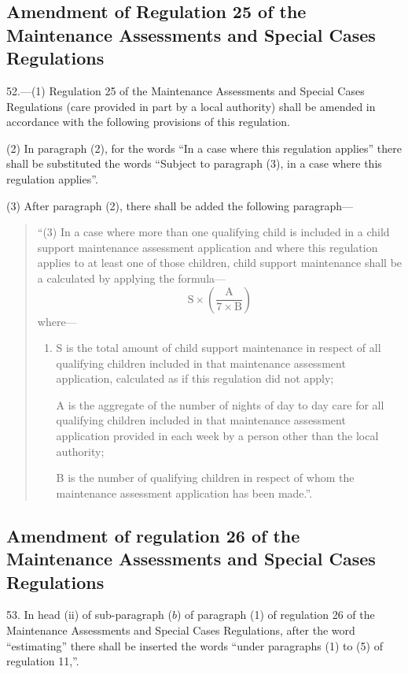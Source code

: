 \documentclass[a4paper]{article}
\begin{document}
\subsection[52. Amendment of Regulation 25 of the Maintenance Assessments and Special Cases Regulations]{Amendment of Regulation 25 of the Maintenance Assessments and Special Cases Regulations}

52.—(1) Regulation 25 of the Maintenance Assessments and Special Cases Regulations (care provided in part by a local authority) shall be amended in accordance with the following provisions of this regulation.

(2) In paragraph (2), for the words “In a case where this regulation applies” there shall be substituted the words “Subject to paragraph (3), in a case where this regulation applies”.

(3) After paragraph (2), there shall be added the following paragraph—
\begin{quotation}
“(3) In a case where more than one qualifying child is included in a child support maintenance assessment application and where this regulation applies to at least one of those children, child support maintenance shall be a calculated by applying the formula—
\[ \mathrm{S} \times \left( \frac{\mathrm{A}}{7 \times \mathrm{B}} \right)  \]
where—
\begin{enumerate}\item[]
S is the total amount of child support maintenance in respect of all qualifying children included in that maintenance assessment application, calculated as if this regulation did not apply;

A is the aggregate of the number of nights of day to day care for all qualifying children included in that maintenance assessment application provided in each week by a person other than the local authority;

B is the number of qualifying children in respect of whom the maintenance assessment application has been made.”.
\end{enumerate}
\end{quotation}

\subsection[53. Amendment of regulation 26 of the Maintenance Assessments and Special Cases Regulations]{Amendment of regulation 26 of the Maintenance Assessments and Special Cases Regulations}

53.  In head (ii) of sub-paragraph ($b$) of paragraph (1) of regulation 26 of the Maintenance Assessments and Special Cases Regulations, after the word “estimating” there shall be inserted the words “under paragraphs (1) to (5) of regulation 11,”.
\end{document}
